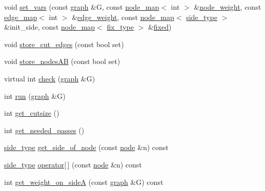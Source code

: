 \begin{DoxyCompactItemize}
void \mbox{\hyperlink{classfm__partition_a19ade0d3e19eb40841238c1048c4495b}{set\+\_\+vars}} (const \mbox{\hyperlink{classgraph}{graph}} \&G, const \mbox{\hyperlink{classnode__map}{node\+\_\+map}}$<$ int $>$ \&\mbox{\hyperlink{classfm__partition_ae1ba643b4bd6721075ab7b608bcf3cd6}{node\+\_\+weight}}, const \mbox{\hyperlink{classedge__map}{edge\+\_\+map}}$<$ int $>$ \&\mbox{\hyperlink{classfm__partition_adfe6147ba3f9c785f613b472f950595f}{edge\+\_\+weight}}, const \mbox{\hyperlink{classnode__map}{node\+\_\+map}}$<$ \mbox{\hyperlink{classfm__partition_a7cdff1bea3740a287387e8408e16ca79}{side\+\_\+type}} $>$ \&init\+\_\+side, const \mbox{\hyperlink{classnode__map}{node\+\_\+map}}$<$ \mbox{\hyperlink{classfm__partition_a63693cd93d587dca3d1842f831cd1c55}{fix\+\_\+type}} $>$ \&\mbox{\hyperlink{classfm__partition_a3b04658dbb5b27ddd20194ff74a71082}{fixed}})
\item 
void \mbox{\hyperlink{classfm__partition_ad0870674a1fb8e1c882f6855e32aec09}{store\+\_\+cut\+\_\+edges}} (const bool set)
\item 
void \mbox{\hyperlink{classfm__partition_a8926005b4637055d2acf6f29ad2d9b97}{store\+\_\+nodes\+AB}} (const bool set)
\item 
virtual int \mbox{\hyperlink{classfm__partition_af72a9fcc300ab0f202168c819b089e5d}{check}} (\mbox{\hyperlink{classgraph}{graph}} \&G)
\item 
int \mbox{\hyperlink{classfm__partition_a015b171fcaa01973ebe6c6a46a727097}{run}} (\mbox{\hyperlink{classgraph}{graph}} \&G)
\item 
int \mbox{\hyperlink{classfm__partition_a42fa2e19fb3fde093a1a05d0bd6d8ad1}{get\+\_\+cutsize}} ()
\item 
int \mbox{\hyperlink{classfm__partition_aa8aa84286a6939d17175fbf646ba3176}{get\+\_\+needed\+\_\+passes}} ()
\item 
\mbox{\hyperlink{classfm__partition_a7cdff1bea3740a287387e8408e16ca79}{side\+\_\+type}} \mbox{\hyperlink{classfm__partition_af5f6ad817fe30760f3bc5470bd70c4c9}{get\+\_\+side\+\_\+of\+\_\+node}} (const \mbox{\hyperlink{classnode}{node}} \&n) const
\item 
\mbox{\hyperlink{classfm__partition_a7cdff1bea3740a287387e8408e16ca79}{side\+\_\+type}} \mbox{\hyperlink{classfm__partition_a45ef6bc577ce894ead2c699678e26f1b}{operator\mbox{[}$\,$\mbox{]}}} (const \mbox{\hyperlink{classnode}{node}} \&n) const
\item 
int \mbox{\hyperlink{classfm__partition_a3f1ddcff1ba7a4c4090f947f918b5331}{get\+\_\+weight\+\_\+on\+\_\+sideA}} (const \mbox{\hyperlink{classgraph}{graph}} \&G) const

\end{DoxyCompactItemize}
